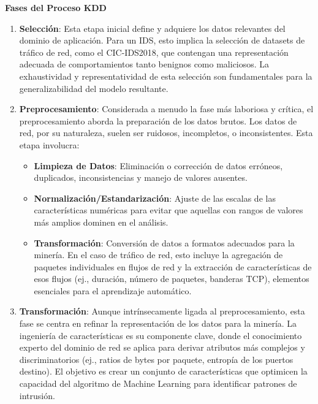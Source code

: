 \textbf{Fases del Proceso KDD}
\begin{enumerate}

    \item\textbf{Selección}: Esta etapa inicial define y adquiere los datos relevantes del dominio de aplicación. Para un IDS, esto implica la selección de datasets de tráfico de red, como el CIC-IDS2018, que contengan una representación adecuada de comportamientos tanto benignos como maliciosos. La exhaustividad y representatividad de esta selección son fundamentales para la generalizabilidad del modelo resultante.
    
    \item\textbf{Preprocesamiento}: Considerada a menudo la fase más laboriosa y crítica, el preprocesamiento aborda la preparación de los datos brutos. Los datos de red, por su naturaleza, suelen ser ruidosos, incompletos, o inconsistentes. Esta etapa involucra:
    \begin{itemize}

        \item\textbf{Limpieza de Datos}: Eliminación o corrección de datos erróneos, duplicados, inconsistencias y manejo de valores ausentes.
        
        \item\textbf{Normalización/Estandarización}: Ajuste de las escalas de las características numéricas para evitar que aquellas con rangos de valores más amplios dominen en el análisis.
        
        \item\textbf{Transformación}: Conversión de datos a formatos adecuados para la minería. En el caso de tráfico de red, esto incluye la agregación de paquetes individuales en flujos de red y la extracción de características de esos flujos (ej., duración, número de paquetes, banderas TCP), elementos esenciales para el aprendizaje automático.
          
    \end{itemize}
    \item\textbf{Transformación}: Aunque intrínsecamente ligada al preprocesamiento, esta fase se centra en refinar la representación de los datos para la minería. La ingeniería de características es su componente clave, donde el conocimiento experto del dominio de red se aplica para derivar atributos más complejos y discriminatorios (ej., ratios de bytes por paquete, entropía de los puertos destino). El objetivo es crear un conjunto de características que optimicen la capacidad del algoritmo de Machine Learning para identificar patrones de intrusión.
    

\end{enumerate}
